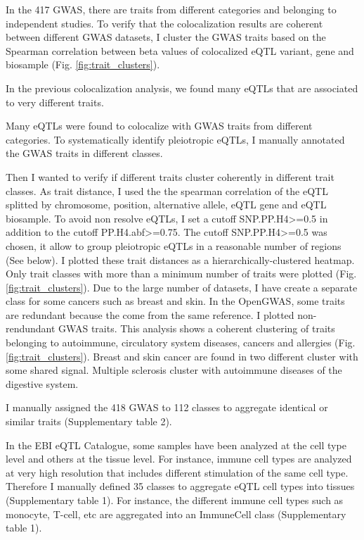 
In the 417 GWAS, there are traits from different categories and belonging to independent studies.
%
To verify that the colocalization results are coherent between different GWAS datasets,
I cluster the GWAS traits based on the Spearman correlation between beta values
of colocalized eQTL variant, gene and biosample (Fig. \ref{fig:trait_clusters}).


In the previous colocalization analysis, we found many eQTLs that are associated to very different traits.

Many eQTLs were found to colocalize with GWAS traits from different categories.
%
To systematically identify pleiotropic eQTLs, I manually annotated the GWAS traits in different classes.

Then I wanted to verify if different traits cluster coherently in different trait classes.
%
As trait distance, I used the the spearman correlation of the eQTL splitted by
chromosome, position, alternative allele, eQTL gene and eQTL biosample.
%
To avoid non resolve eQTLs, I set a cutoff SNP.PP.H4>=0.5 in addition to the cutoff PP.H4.abf>=0.75.
%
The cutoff SNP.PP.H4>=0.5 was chosen, it allow to group pleiotropic eQTLs in a reasonable number of regions (See below).
%
I plotted these trait distances as a hierarchically-clustered heatmap.
%
Only trait classes with more than a minimum number of traits were plotted (Fig. \ref{fig:trait_clusters}).
%
Due to the large number of datasets, I have create a separate class for some cancers such as breast and skin.
%
In the OpenGWAS, some traits are redundant because the come from the same reference.
%
I plotted non-rendundant GWAS traits.
%
This analysis shows a coherent clustering of traits belonging to autoimmune, circulatory system diseases, cancers and allergies (Fig. \ref{fig:trait_clusters}).
%
Breast and skin cancer are found in two different cluster with some shared signal.
%
Multiple sclerosis cluster with autoimmune diseases of the digestive system.

I manually assigned the 418 GWAS to 112 classes to aggregate identical or similar traits (Supplementary table 2).

In the EBI eQTL Catalogue, some samples have been analyzed at the cell type level and others at the tissue level.
%
For instance, immune cell types are analyzed at very high resolution that includes different stimulation of the same cell type.
%
Therefore I manually defined 35 classes to aggregate eQTL cell types into tissues (Supplementary table 1).
%
For instance, the different immune cell types such as monocyte, T-cell, etc are aggregated into an ImmuneCell class (Supplementary table 1).

